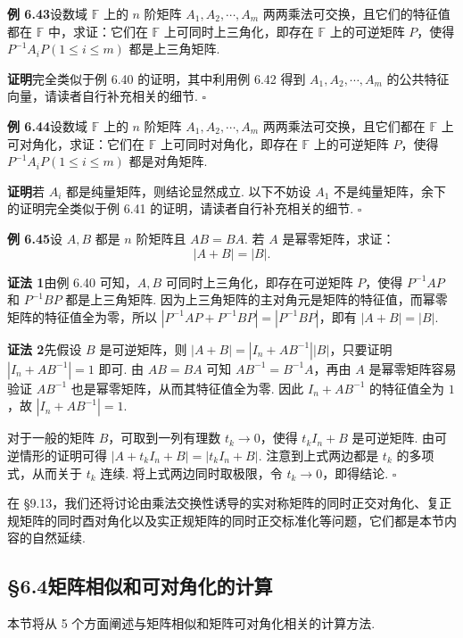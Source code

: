 \documentclass[UTF8, 12pt, fontset=fandol, oneside]{ctexart}
\begin{document}
\noindent\textbf{例 6.43}\quad 设数域 $\mathbb{F}$ 上的 $n$ 阶矩阵 $A_1,A_2,\cdots,A_m$ 两两乘法可交换，且它们的特征值都在 $\mathbb{F}$ 中，求证：它们在 $\mathbb{F}$ 上可同时上三角化，即存在 $\mathbb{F}$ 上的可逆矩阵 $P$，使得 $P^{-1}A_iP(1\le i\le m)$ 都是上三角矩阵.

\noindent\textbf{证明}\quad 完全类似于例 6.40 的证明，其中利用例 6.42 得到 $A_1,A_2,\cdots,A_m$ 的公共特征向量，请读者自行补充相关的细节. $\square$

\noindent\textbf{例 6.44}\quad 设数域 $\mathbb{F}$ 上的 $n$ 阶矩阵 $A_1,A_2,\cdots,A_m$ 两两乘法可交换，且它们都在 $\mathbb{F}$ 上可对角化，求证：它们在 $\mathbb{F}$ 上可同时对角化，即存在 $\mathbb{F}$ 上的可逆矩阵 $P$，使得 $P^{-1}A_iP(1\le i\le m)$ 都是对角矩阵.

\noindent\textbf{证明}\quad 若 $A_i$ 都是纯量矩阵，则结论显然成立. 以下不妨设 $A_1$ 不是纯量矩阵，余下的证明完全类似于例 6.41 的证明，请读者自行补充相关的细节. $\square$

\noindent\textbf{例 6.45}\quad 设 $A,B$ 都是 $n$ 阶矩阵且 $AB=BA$. 若 $A$ 是幂零矩阵，求证：
\[
|A+B|=|B|.
\]

\noindent\textbf{证法 1}\quad 由例 6.40 可知，$A,B$ 可同时上三角化，即存在可逆矩阵 $P$，使得 $P^{-1}AP$ 和 $P^{-1}BP$ 都是上三角矩阵. 因为上三角矩阵的主对角元是矩阵的特征值，而幂零矩阵的特征值全为零，所以 $|P^{-1}AP+P^{-1}BP|=|P^{-1}BP|$，即有 $|A+B|=|B|$.

\noindent\textbf{证法 2}\quad 先假设 $B$ 是可逆矩阵，则 $|A+B|=|I_n+AB^{-1}||B|$，只要证明 $|I_n+AB^{-1}|=1$ 即可. 由 $AB=BA$ 可知 $AB^{-1}=B^{-1}A$，再由 $A$ 是幂零矩阵容易验证 $AB^{-1}$ 也是幂零矩阵，从而其特征值全为零. 因此 $I_n+AB^{-1}$ 的特征值全为 $1$，故 $|I_n+AB^{-1}|=1$.

对于一般的矩阵 $B$，可取到一列有理数 $t_k\to 0$，使得 $t_kI_n+B$ 是可逆矩阵. 由可逆情形的证明可得 $|A+t_kI_n+B|=|t_kI_n+B|$. 注意到上式两边都是 $t_k$ 的多项式，从而关于 $t_k$ 连续. 将上式两边同时取极限，令 $t_k\to 0$，即得结论. $\square$

在 §9.13，我们还将讨论由乘法交换性诱导的实对称矩阵的同时正交对角化、复正规矩阵的同时酉对角化以及实正规矩阵的同时正交标准化等问题，它们都是本节内容的自然延续.

\subsection*{§6.4\quad 矩阵相似和可对角化的计算}

本节将从 5 个方面阐述与矩阵相似和矩阵可对角化相关的计算方法.
\end{document}
